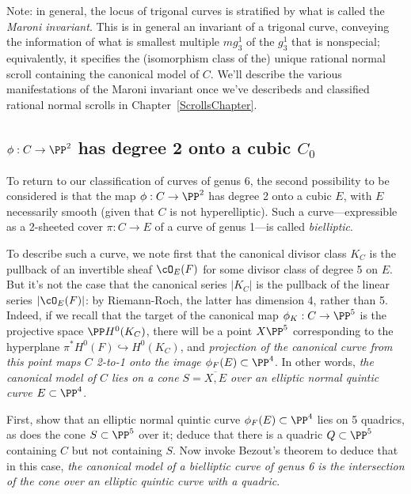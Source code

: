
Note: in general, the locus of trigonal curves is stratified by what is called the \emph{Maroni invariant}. This is in general an invariant of a trigonal curve, conveying the information of what is smallest multiple $mg^1_3$ of the $g^1_3$ that is nonspecial; equivalently, it specifies the (isomorphism class of the) unique rational normal scroll containing the canonical model of $C$. We'll describe the various manifestations of the Maroni invariant once we've describeds and classified rational normal scrolls in Chapter~\ref{ScrollsChapter}.

\subsection{$\phi : C \to \PP^2$ has degree 2 onto a cubic $C_0$}

To return to our classification of curves of genus 6, the second possibility to be considered is that the map $\phi : C \to \PP^2$ has degree 2 onto a cubic $E$, with $E$ necessarily smooth (given that $C$ is not hyperelliptic). Such a curve---expressible as a 2-sheeted cover $\pi : C \to E$ of a curve of genus 1---is called \emph{bielliptic}.

To describe such a curve, we note first that the canonical divisor class $K_C$ is the pullback of an invertible sheaf $\cO_E(F)$ for some divisor class of degree 5 on $E$. But it's not the case that the canonical series $|K_C|$ is the pullback of the linear series $|\cO_E(F)|$: by Riemann-Roch, the latter has dimension 4, rather than 5. Indeed, if we recall that the target of the canonical map $\phi_K : C \to \PP^5$ is the projective space $\PP H^0(K_C)$, there will be a point $X \PP^5$ corresponding to the hyperplane $\pi^*H^0(F) \hookrightarrow H^0(K_C)$, and \emph{projection of the canonical curve from this point maps $C$ 2-to-1 onto the image $\phi_F(E) \subset \PP^4$}. In other words, \emph{the canonical model of $C$ lies on a cone $S = \overline{X, E}$ over an elliptic normal quintic curve $E \subset \PP^4$}.

\begin{exercise}
First, show that an elliptic normal quintic curve $\phi_F(E) \subset \PP^4$ lies on 5 quadrics, as does the cone $S \subset \PP^5$ over it; deduce that there is a quadric $Q \subset \PP^5$ containing $C$ but not containing $S$. Now invoke Bezout's theorem to deduce that in this case, \emph{the canonical model of a bielliptic curve of genus 6 is the intersection of the cone over an elliptic quintic curve with a quadric}.
\end{exercise}


